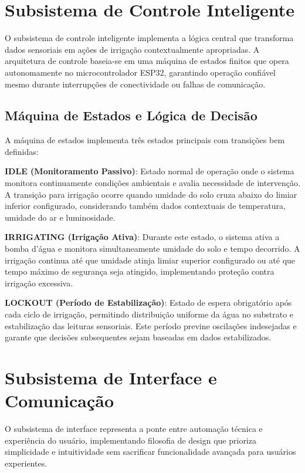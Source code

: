 \documentclass[twoside,english,brazilian]{UNISINOSmonografia}
\begin{document}
\section{Subsistema de Controle Inteligente}

O subsistema de controle inteligente implementa a lógica central que transforma dados sensoriais em ações de irrigação contextualmente apropriadas. A arquitetura de controle baseia-se em uma máquina de estados finitos que opera autonomamente no microcontrolador ESP32, garantindo operação confiável mesmo durante interrupções de conectividade ou falhas de comunicação.

\subsection{Máquina de Estados e Lógica de Decisão}

A máquina de estados implementa três estados principais com transições bem definidas:

\textbf{IDLE (Monitoramento Passivo)}: Estado normal de operação onde o sistema monitora continuamente condições ambientais e avalia necessidade de intervenção. A transição para irrigação ocorre quando umidade do solo cruza abaixo do limiar inferior configurado, considerando também dados contextuais de temperatura, umidade do ar e luminosidade.

\textbf{IRRIGATING (Irrigação Ativa)}: Durante este estado, o sistema ativa a bomba d'água e monitora simultaneamente umidade do solo e tempo decorrido. A irrigação continua até que umidade atinja limiar superior configurado ou até que tempo máximo de segurança seja atingido, implementando proteção contra irrigação excessiva.

\textbf{LOCKOUT (Período de Estabilização)}: Estado de espera obrigatório após cada ciclo de irrigação, permitindo distribuição uniforme da água no substrato e estabilização das leituras sensoriais. Este período previne oscilações indesejadas e garante que decisões subsequentes sejam baseadas em dados estabilizados.

\section{Subsistema de Interface e Comunicação}

O subsistema de interface representa a ponte entre automação técnica e experiência do usuário, implementando filosofia de design que prioriza simplicidade e intuitividade sem sacrificar funcionalidade avançada para usuários experientes.
\end{document}

